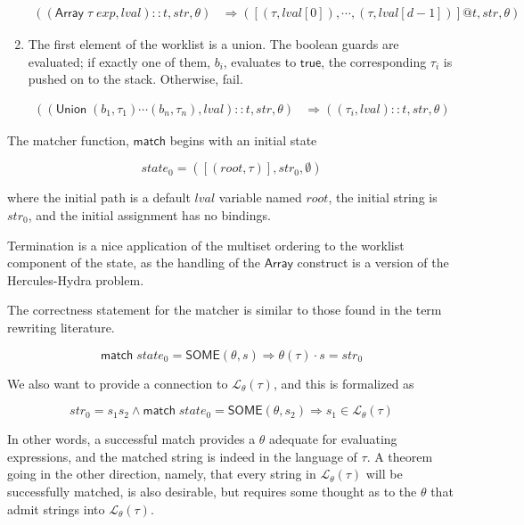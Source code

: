 \documentclass[svgnames]{llncs}
\newcommand{\konst}[1]{\ensuremath{\mathsf{#1}}}
\newcommand{\imp}{\Rightarrow}
\newcommand{\lval}{\ensuremath{\mathit{lval}}}
\newcommand{\LangTheta}[1]{\ensuremath{{\mathcal L}_{\theta}({#1})}}
\begin{document}
\begin{definition}
\begin{enumerate}
\begin{align*}
((\konst{Array}\; \tau \; \mathit{exp},\lval)::t, \mathit{str}, \theta)
   &\Rightarrow
  ([(\tau,\lval[0]), \cdots , (\tau,\lval[d-1])] @ t,\mathit{str}, \theta)
\end{align*}

\item The first element of the worklist is a union. The boolean guards
  are evaluated; if exactly one of them, $b_i$, evaluates to \konst{true}, the
  corresponding $\tau_i$ is pushed on to the stack. Otherwise, fail.

\begin{align*}
((\konst{Union}\; (b_1,\tau_1) \cdots (b_n,\tau_n), \lval)::t, \mathit{str}, \theta)
   &\Rightarrow
  ((\tau_i,\lval)::t,\mathit{str}, \theta)
\end{align*}

\end{enumerate}

\noindent The matcher function, \konst{match} begins with an initial state

\[
  \mathit{state}_0 = ([(\mathit{root},\tau)],\mathit{str}_0,\emptyset)
\]

where the initial path is a default \lval{} variable named
$\mathit{root}$, the initial string is $\mathit{str}_0$, and the
initial assignment has no bindings.

\end{definition}

\begin{theorem}
Termination is a nice application of the multiset ordering to the
worklist component of the state, as the handling of the \konst{Array}
construct is a version of the Hercules-Hydra problem.
\end{theorem}

The correctness statement for the matcher is similar to those found in
the term rewriting literature.

\begin{theorem}

\[
  \konst{match}\; \mathit{state}_0 = \konst{SOME}(\theta, s)
  \imp \theta(\tau) \cdot s = \mathit{str}_0
\]

\noindent We also want to provide a connection to $\LangTheta{\tau}$,
and this is formalized as

\[
  \mathit{str}_0 = s_1 s_2 \land \konst{match}\; \mathit{state}_0 =
  \konst{SOME}(\theta, s_2) \imp s_1 \in \LangTheta{\tau}
\]

In other words, a successful match provides a $\theta$ adequate for
evaluating expressions, and the matched string is indeed in the
language of $\tau$. A theorem going in the other direction, namely,
that every string in $\LangTheta{\tau}$ will be successfully
matched, is also desirable, but requires some thought as to the
$\theta$ that admit strings into $\LangTheta{\tau}$.

\end{theorem}
\end{document}
